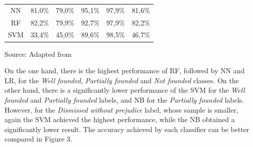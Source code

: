 \begin{table}[htb]
\begin{tabular}{@{}crrrrr@{}}
NN                 & 81,0\%                                                                              & 79,0\%                                                                                & 95,1\%                                                                             & 97,9\%                                                                                               & 81,6\%                                                                                  \\\hdashline
RF                 & 82,2\%                                                                              & 79,9\%                                                                                & 92,7\%                                                                             & 97,9\%                                                                                               & 82,2\%                                                                                  \\\hdashline
SVM                & 33,4\%                                                                              & 45,0\%                                                                                & 89,6\%                                                                             & 98,5\%                                                                                               & 46,7\%                                                                                  \\ \bottomrule
\end{tabular}

Source: Adapted from \textcite{Sabo2019}
\end{table}


On the one hand, there is the highest performance of RF, followed by NN and LR, for the \textit{Well founded}, \emph{Partially founded} and \emph{Not founded} classes. On the other hand, there is a significantly lower performance of the SVM for the \textit{Well founded} and \emph{Partially founded} labels, and NB for the  \emph{Partially founded} labels. However, for the \emph{Dismissed without prejudice} label, whose sample is smaller, again the SVM achieved the highest performance, while the NB obtained a significantly lower result. The accuracy achieved by each classifier can be better compared in Figure 3. 


